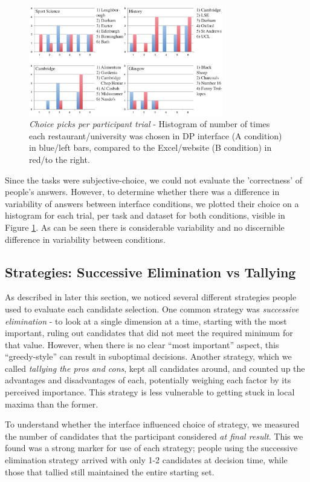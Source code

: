 \documentclass{sigchi}
\begin{document}
\begin{figure}[htb]
\begin{center}
\includegraphics[width=8.5cm]{img/results}
\caption{\emph{Choice picks per participant trial} - Histogram of number of times each restaurant/university was chosen in DP interface (A condition) in blue/left bars, compared to the Excel/website (B condition) in red/to the right.}
\label{fig:chosen_results}
\end{center}
\end{figure}

Since the tasks were subjective-choice, we could not evaluate the 'correctness' of people's answers.  However, to determine whether there was a difference in variability of answers between interface conditions, we plotted their choice on a histogram for each trial, per task and dataset for both conditions, visible in Figure \ref{fig:chosen_results}.  As can be seen there is considerable variability and no discernible difference in variability between conditions.  

\subsection{Strategies: Successive Elimination vs Tallying}
As described in later this section, we noticed several different strategies people used to evaluate each candidate selection. One common strategy was \emph{successive elimination} - to look at a single dimension at a time, starting with the most important, ruling out candidates that did not meet the required minimum for that value.  However, when there is no clear ``most important'' aspect, this  ``greedy-style'' can result in suboptimal decisions.  Another strategy, which we called \emph{tallying the pros and cons}, kept all candidates around, and counted up the advantages and disadvantages of each, potentially weighing each factor by its perceived importance.  This strategy is less vulnerable to getting stuck in local maxima than the former.

To understand whether the interface influenced choice of strategy, we measured the number of candidates that the participant considered \emph{at final result}.  This we found was a strong marker for use of each strategy; people using the successive elimination strategy arrived with only 1-2 candidates at decision time, while those that tallied still maintained the entire starting set.  
\end{document}
